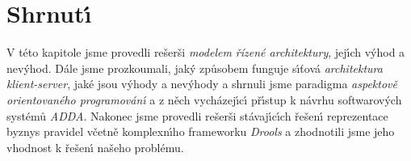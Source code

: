 \section{Shrnut\'{\i}}

V této kapitole jsme provedli rešerši \textit{modelem řízené architektury},
jej\'{\i}ch v\'yhod a nev\'yhod. Dále jsme prozkoumali, jak\'y způsobem funguje
s\'{\i}ťová \textit{architektura klient-server}, jaké jsou v\'yhody a nev\'yhody
a shrnuli jsme paradigma \textit{aspektově orientovaného programován\'{\i}} a
z něch vycházej\'{\i}c\'{\i} př\'{\i}stup k návrhu softwarov\'ych systémů \textit{ADDA}.
Nakonec jsme provedli rešerši stávaj\'{\i}c\'{\i}ch řešen\'{\i} reprezentace byznys pravidel
včetně komplexn\'{\i}ho frameworku \textit{Drools} a zhodnotili jsme jeho vhodnost
k řešen\'{\i} našeho problému. %

